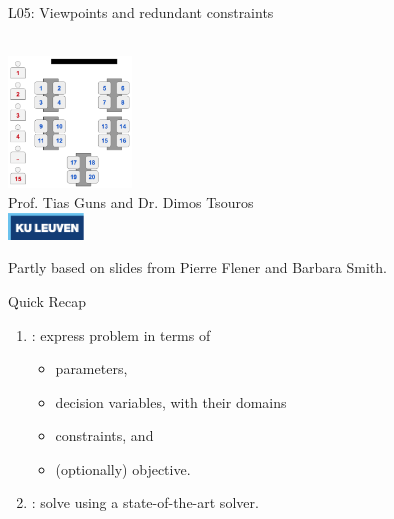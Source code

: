 \documentclass{cons-beamer}
\begin{document}
\begin{frame}{L05: Viewpoints and redundant constraints}
  \begin{center}
    ~ \\
    \includegraphics[height=35mm]{images/ssp.png} \\
    Prof. Tias Guns and Dr. Dimos Tsouros \\[0.5em]
    \includegraphics[width=2cm]{images/kuleuven_CMYK_logo.pdf}
  \end{center}
  
  {\footnotesize 
  Partly based on slides from Pierre Flener and Barbara Smith.}
\end{frame}

\begin{frame}{Quick Recap}
  \begin{enumerate}
    \item {}: express problem in terms of \vfill
    \begin{itemize}
      \item parameters, \vfill
      \item decision variables, with their domains \vfill
      \item constraints, and \vfill
      \item (optionally) objective.
    \end{itemize} \vfill
    \item {}: solve using a state-of-the-art solver.
  \end{enumerate}
\end{frame}
\end{document}
